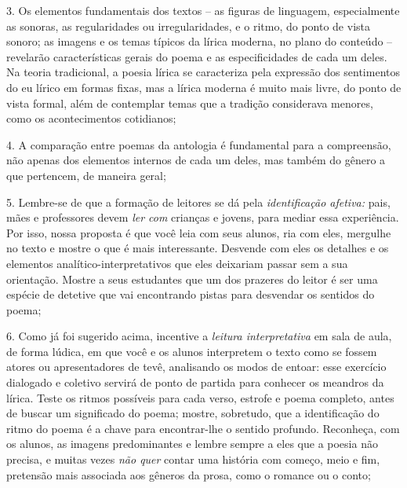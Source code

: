 \documentclass[11pt]{extarticle}
\begin{document}
\vspace{3mm}

3. Os elementos fundamentais dos textos -- as figuras de linguagem,
especialmente as sonoras, as regularidades ou irregularidades, e o
ritmo, do ponto de vista sonoro; as imagens e os temas típicos da lírica
moderna, no plano do conteúdo -- revelarão características gerais do
poema e as especificidades de cada um deles. Na teoria tradicional, a
poesia lírica se caracteriza pela expressão dos sentimentos do eu lírico
em formas fixas, mas a lírica moderna é muito mais livre, do ponto de
vista formal, além de contemplar temas que a tradição considerava
menores, como os acontecimentos cotidianos;

\vspace{3mm}

4. A comparação entre poemas da antologia é fundamental para a
compreensão, não apenas dos elementos internos de cada um deles, mas
também do gênero a que pertencem, de maneira geral;

\vspace{3mm}

5. Lembre-se de que a formação de leitores se dá pela
\emph{identificação afetiva:} pais, mães e professores devem \emph{ler
com} crianças e jovens, para mediar essa experiência. Por isso, nossa
proposta é que você leia com seus alunos, ria com eles, mergulhe no
texto e mostre o que é mais interessante. Desvende com eles os detalhes
e os elementos analítico-interpretativos que eles deixariam passar sem a
sua orientação. Mostre a seus estudantes que um dos prazeres do leitor é
ser uma espécie de detetive que vai encontrando pistas para desvendar os
sentidos do poema;

\vspace{3mm}

6. Como já foi sugerido acima, incentive a \emph{leitura interpretativa}
em sala de aula, de forma lúdica, em que você e os alunos interpretem o
texto como se fossem atores ou apresentadores de tevê, analisando os
modos de entoar: esse exercício dialogado e coletivo servirá de ponto de
partida para conhecer os meandros da lírica. Teste os ritmos possíveis
para cada verso, estrofe e poema completo, antes de buscar um
significado do poema; mostre, sobretudo, que a identificação do ritmo do
poema é a chave para encontrar-lhe o sentido profundo. Reconheça, com os
alunos, as imagens predominantes e lembre sempre a eles que a poesia não
precisa, e muitas vezes \emph{não quer} contar uma história com começo,
meio e fim, pretensão mais associada aos gêneros da prosa, como o
romance ou o conto;
\end{document}
